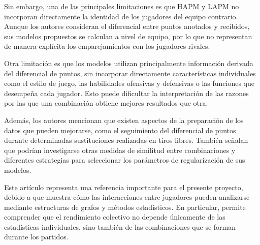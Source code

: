 Sin embargo, una de las principales limitaciones es que HAPM y LAPM no incorporan directamente la identidad de los jugadores del equipo contrario. Aunque los autores consideran el diferencial entre puntos anotados y recibidos, sus modelos propuestos se calculan a nivel de equipo, por lo que no representan de manera explícita los emparejamientos con los jugadores rivales.

Otra limitación es que los modelos utilizan principalmente información derivada del diferencial de puntos, sin incorporar directamente características individuales como el estilo de juego, las habilidades ofensivas y defensivas o las funciones que desempeña cada jugador. Esto puede dificultar la interpretación de las razones por las que una combinación obtiene mejores resultados que otra.

Además, los autores mencionan que existen aspectos de la preparación de los datos que pueden mejorarse, como el seguimiento del diferencial de puntos durante determinadas sustituciones realizadas en tiros libres. También señalan que podrían investigarse otras medidas de similitud entre combinaciones y diferentes estrategias para seleccionar los parámetros de regularización de sus modelos.

Este artículo representa una referencia importante para el presente proyecto, debido a que muestra cómo las interacciones entre jugadores pueden analizarse mediante estructuras de grafos y métodos estadísticos. En particular, permite comprender que el rendimiento colectivo no depende únicamente de las estadísticas individuales, sino también de las combinaciones que se forman durante los partidos.

\cite{josephs2025hypergraphadjustedplusminus}
